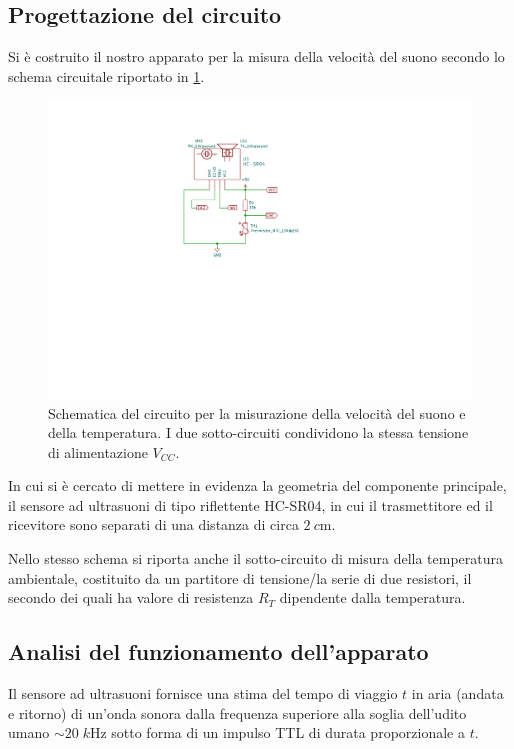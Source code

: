 \documentclass[10pt, a4paper, italian]{article}
\begin{document}
\subsection{Progettazione del circuito}
Si è costruito il nostro apparato per la misura della velocità del suono
secondo lo schema circuitale riportato in \cref{schm: mesctrl}.
\begin{figure}[htbp]
    \centering
	\includegraphics[scale=1]{schm}
    \caption{Schematica del circuito per la misurazione della velocità del
    suono e della temperatura. I due sotto-circuiti condividono la stessa
    tensione di alimentazione $V_{CC}$.
    \label{schm: mesctrl}}
\end{figure}

In cui si è cercato di mettere in evidenza la geometria del componente
principale, il sensore ad ultrasuoni di tipo riflettente HC-SR04, in cui
il trasmettitore ed il ricevitore sono separati di una distanza di circa
$\SI{2}{c\m}$.

Nello stesso schema si riporta anche il sotto-circuito di misura della
temperatura ambientale, costituito da un partitore di tensione/la
serie di due resistori, il secondo dei quali ha valore di resistenza $R_T$
dipendente dalla temperatura.

\subsection{Analisi del funzionamento dell'apparato}
Il sensore ad ultrasuoni fornisce una stima del tempo di viaggio $t$ in aria
(andata e ritorno) di un'onda sonora dalla frequenza superiore alla soglia
dell'udito umano $\sim 20 \; \si{k\Hz}$ sotto forma di un impulso TTL di
durata proporzionale a $t$.
\end{document}
